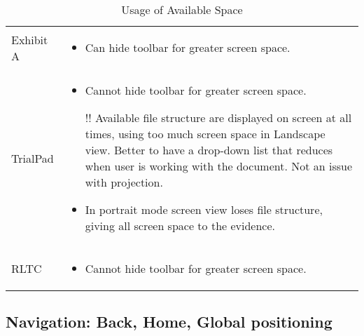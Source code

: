 \begin{center}
\begin{table}[htbp]
\label{tab:UsageOfAvailableSpace}
  \centering
  \caption{Usage of Available Space}
    \begin{tabular}{|p{}|p{}|}
    \hline
    \rowcolor{lightgrey}\multicolumn{2}{c}{Usage of Available Space} \\
    \hline
    Exhibit A &
    \begin{itemize}
      \item Can hide toolbar for greater screen space.
    \end{itemize}\\
    \hline
    TrialPad &
    \begin{itemize}
      \item Cannot hide toolbar for greater screen space.
     \item [\color{amber}!!]\color{black}Available file structure are displayed on screen at all times, using too much screen space in Landscape view. Better to have a drop-down list that reduces when user is working with the document. Not an issue with projection.
      \item In portrait mode screen view loses file structure, giving all screen space to the evidence.
    \end{itemize}\\
    \hline
    RLTC &
    \begin{itemize}
      \item Cannot hide toolbar for greater screen space.
         \end{itemize}\\
    \hline
\end{tabular}
\end{table}
\end{center}

\newpage
\subsection{Navigation: Back, Home, Global positioning}

